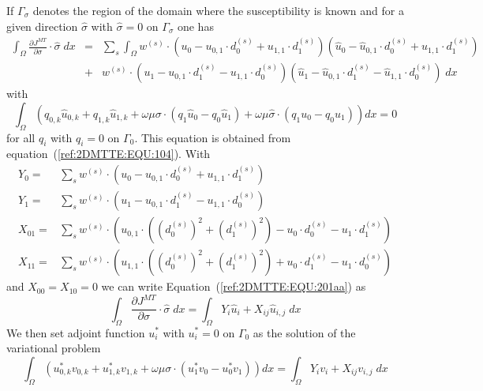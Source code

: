 If $\Gamma_{\sigma}$ denotes the region of the domain where the susceptibility is
known and for a given direction $\hat{\sigma}$ with $\hat{\sigma}=0$ on $\Gamma_{\sigma}$ one has
\begin{align}\label{ref:2DMTTE:EQU:201aa}
\int_{\Omega}   \frac{\partial J^{MT}}{\partial \sigma} \cdot \hat{\sigma} \; dx  & = &
\sum_{s} \int_{\Omega}  w^{(s)} \cdot \left(  u_0 - u_{0,1} \cdot d_0^{(s)} + u_{1,1} \cdot d_1^{(s)}  \right ) \left(  \hat{u}_0 - \hat{u}_{0,1} \cdot d_0^{(s)} + \hat{u}_{1,1}\cdot d_1^{(s)}  \right )  \\
& + &  w^{(s)} \cdot \left(u_1- u_{0,1} \cdot d_1^{(s)} -u_{1,1} \cdot d_0^{(s)}  \right)   \left(\hat{u}_1- \hat{u}_{0,1} \cdot d_1^{(s)} -\hat{u}_{1,1} \cdot d_0^{(s)} \right) \; dx 
\end{align} 
with
\begin{equation}\label{ref:2DMTTE:EQU:201A}
\int_{\Omega}
\left(
q_{0,k}\hat{u}_{0,k}
+ q_{1,k}\hat{u}_{1,k}
+ \omega \mu \sigma \cdot ( q_1 \hat{u}_0 - q_0 \hat{u}_1)   
+ \omega \mu \hat{\sigma} \cdot ( q_1 u_0 - q_0 u_1) \right) dx =0
\end{equation}
for all $q_i$ with $q_i=0$ on $\Gamma_{0}$. This equation is obtained from equation~(\ref{ref:2DMTTE:EQU:104}).
With
\begin{align}\label{ref:2DMTTE:EQU:202b}
Y_0  = & \sum_{s} w^{(s)} \cdot \left(  u_0 - u_{0,1} \cdot d_0^{(s)} + u_{1,1} \cdot d_1^{(s)}  \right) \\
Y_1  = & \sum_{s} w^{(s)} \cdot \left(  u_1 - u_{0,1} \cdot d_1^{(s)} - u_{1,1} \cdot d_0^{(s)}  \right)   \\
X_{01}  = &  \sum_{s} w^{(s)} \cdot \left(    u_{0,1} \cdot ( ( d_0^{(s)})^2 + (d_1^{(s)})^2) -  u_0 \cdot d_0^{(s)} -  u_1 \cdot d_1^{(s)} \right)    \\
X_{11}  = & \sum_{s} w^{(s)} \cdot \left(  u_{1,1} \cdot ( ( d_0^{(s)})^2 + (d_1^{(s)})^2)  + u_0 \cdot d_1^{(s)} - u_1 \cdot d_0^{(s)} \right)
\end{align} 
and $X_{00}=X_{10}=0$ we can write Equation~(\ref{ref:2DMTTE:EQU:201aa}) as 
\begin{equation}\label{ref:2DMTTE:EQU:202c}
\int_{\Omega}   \frac{\partial J^{MT}}{\partial \sigma} \cdot \hat{\sigma} \; dx  =
\int_{\Omega}  Y_i \hat{u}_i + X_{ij}  \hat{u}_{i,j} \; dx
\end{equation}
We then set adjoint function $u_i^*$ with $u_i^*=0$ on $\Gamma_{0}$ as the solution of the variational problem  
\begin{equation}\label{ref:2DMTTE:EQU:202d}
\int_{\Omega}
\left(
u^*_{0,k} v_{0,k}
+ u^*_{1,k} v_{1,k}
+ \omega \mu \sigma \cdot ( u^*_1 v_0 - u^*_0 v_1) \right) dx = \int_{\Omega}  Y_i v_i + X_{ij}  v_{i,j} \; dx  
\end{equation}

